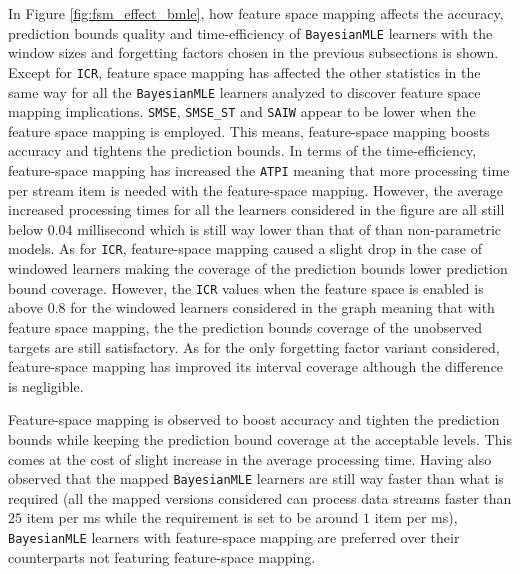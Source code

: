 In Figure \ref{fig:fsm_effect_bmle}, how feature space mapping affects the accuracy, prediction bounds quality and time-efficiency of \texttt{BayesianMLE} learners with the window sizes and forgetting factors chosen in the previous subsections is shown. Except for \texttt{ICR}, feature space mapping has affected the other statistics in the same way for all the \texttt{BayesianMLE} learners analyzed to discover feature space mapping implications. \texttt{SMSE}, \texttt{SMSE\_ST} and \texttt{SAIW} appear to be lower when the feature space mapping is employed. This means, feature-space mapping boosts accuracy and tightens the prediction bounds. In terms of the time-efficiency, feature-space mapping has increased the \texttt{ATPI} meaning that more processing time per stream item is needed with the feature-space mapping. However, the average increased processing times for all the learners considered in the figure are all still below $0.04$ millisecond which is still way lower than that of than non-parametric models.  As for \texttt{ICR}, feature-space mapping caused a slight drop in the case of windowed learners making the coverage of the prediction bounds lower prediction bound coverage. However, the \texttt{ICR} values when the feature space is enabled is above $0.8$ for the windowed learners considered in the graph meaning that with feature space mapping, the the prediction bounds coverage of the unobserved targets are still satisfactory. As for the only forgetting factor variant considered, feature-space mapping has improved its interval coverage although the difference is negligible.

Feature-space mapping is observed to boost accuracy and tighten the prediction bounds while keeping the prediction bound coverage at the acceptable levels. This comes at the cost of slight increase in the average processing time. Having also observed that the mapped \texttt{BayesianMLE} learners are still way faster than what is required (all the mapped versions considered can process data streams faster than $25$ item per ms while the requirement is set to be around $1$ item per ms), \texttt{BayesianMLE} learners with feature-space mapping are preferred over their counterparts not featuring feature-space mapping.

